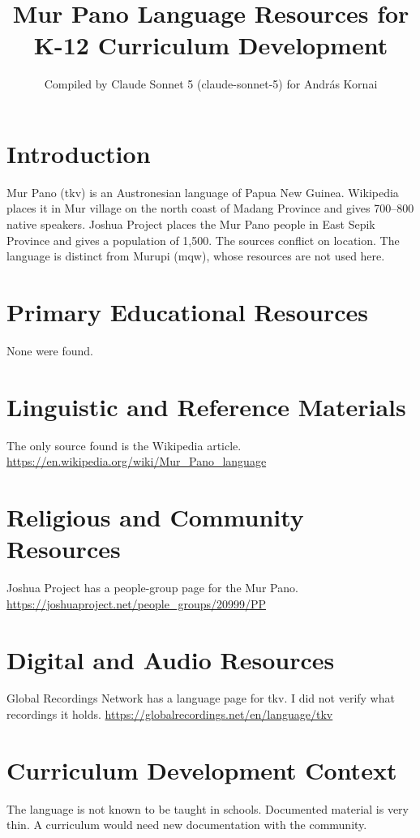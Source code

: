 \documentclass[12pt]{article}
\title{Mur Pano Language Resources for K-12 Curriculum Development}
\author{Compiled by Claude Sonnet 5 (claude-sonnet-5) for Andr\'as Kornai}
\date{}
\begin{document}
\maketitle

\section{Introduction}
Mur Pano (tkv) is an Austronesian language of Papua New Guinea. Wikipedia places it in Mur village on the north coast of Madang Province and gives 700--800 native speakers. Joshua Project places the Mur Pano people in East Sepik Province and gives a population of 1,500. The sources conflict on location. The language is distinct from Murupi (mqw), whose resources are not used here.

\section{Primary Educational Resources}
None were found.

\section{Linguistic and Reference Materials}
The only source found is the Wikipedia article. \url{https://en.wikipedia.org/wiki/Mur_Pano_language}

\section{Religious and Community Resources}
Joshua Project has a people-group page for the Mur Pano. \url{https://joshuaproject.net/people_groups/20999/PP}

\section{Digital and Audio Resources}
Global Recordings Network has a language page for tkv. I did not verify what recordings it holds. \url{https://globalrecordings.net/en/language/tkv}

\section{Curriculum Development Context}
The language is not known to be taught in schools. Documented material is very thin. A curriculum would need new documentation with the community.
\end{document}
